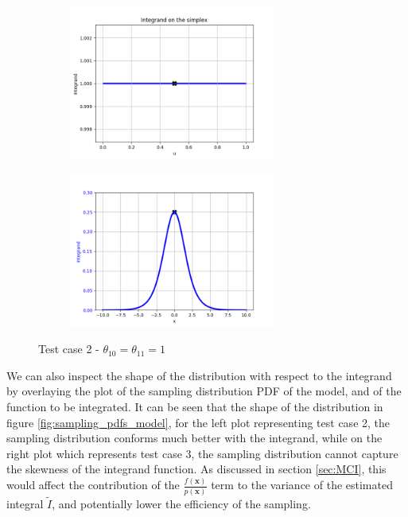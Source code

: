 \begin{figure}[!htb]
\begin{center}
\begin{subfigure}%
    \centering
    \includegraphics[height=2in]{Chap6_EvaluationAndAnalysis/images/Simplex_model_D_1_1_1_1_N_3_3.png}
\end{subfigure}
\begin{subfigure}%
    \centering
    \includegraphics[height=2in]{Chap6_EvaluationAndAnalysis/images/Real_model_D_1_1_1_1_N_3_3.png}
\end{subfigure}
\caption{Test case 2 - \(\theta_{10}=\theta_{11}=1\)}
\label{fig:spec_model_D_1_1_1_1_N_3_3}
\end{center}
\end{figure}

 We can also inspect the shape of the distribution with respect to the integrand by overlaying the plot of the sampling distribution PDF of the model, and of the function to be integrated. It can be seen that the shape of the distribution in figure \ref{fig:sampling_pdfs_model}, for the left plot representing test case 2, the sampling distribution conforms much better with the integrand, while on the right plot which represents test case 3, the sampling distribution cannot capture the skewness of the integrand function. As discussed in section \ref{sec:MCI}, this would affect the contribution of the \(\frac{f(\mathbf{x})}{p(\mathbf{x})}\) term to the variance of the estimated integral \(\widetilde{I}\), and potentially lower the efficiency of the sampling. 
 

